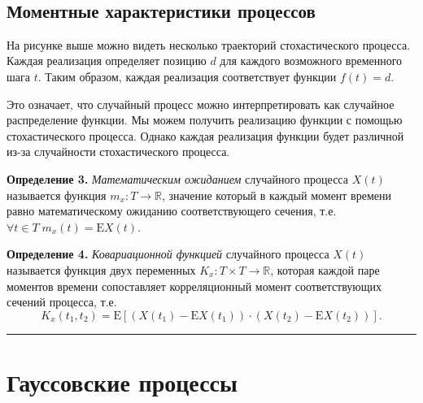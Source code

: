 \documentclass[11pt,a4paper]{article}
\renewcommand{\linethickness}{0.1ex}
\begin{document}
    \begin{center}
    \end{center}
    { \hspace*{\fill} \\}
    
    \hypertarget{ux43cux43eux43cux435ux43dux442ux43dux44bux435-ux445ux430ux440ux430ux43aux442ux435ux440ux438ux441ux442ux438ux43aux438-ux43fux440ux43eux446ux435ux441ux441ux43eux432}{%
\subsection{Моментные характеристики
процессов}\label{ux43cux43eux43cux435ux43dux442ux43dux44bux435-ux445ux430ux440ux430ux43aux442ux435ux440ux438ux441ux442ux438ux43aux438-ux43fux440ux43eux446ux435ux441ux441ux43eux432}}

На рисунке выше можно видеть несколько траекторий стохастического
процесса. Каждая реализация определяет позицию \(d\) для каждого
возможного временного шага \(t\). Таким образом, каждая реализация
соответствует функции \(f(t) = d\).

Это означает, что случайный процесс можно интерпретировать как случайное
распределение функции. Мы можем получить реализацию функции с помощью
стохастического процесса. Однако каждая реализация функции будет
различной из-за случайности стохастического процесса.

\textbf{Определение 3.} \emph{Математическим ожиданием} случайного
процесса \(X(t)\) называется функция \(m_x : T \rightarrow \mathbb{R}\),
значение который в каждый момент времени равно математическому ожиданию
соответствующего сечения, т.е.
\(\forall t \in T \; m_x(t) = \mathrm{E}X(t)\).

\textbf{Определение 4.} \emph{Ковариационной функцией} случайного
процесса \(X(t)\) называется функция двух переменных
\(K_x : T \times T \rightarrow \mathbb{R}\), которая каждой паре
моментов времени сопоставляет корреляционный момент соответствующих
сечений процесса, т.е. \[
    K_x(t_1, t_2) = \mathrm{E} \left[ \left(X(t_1) - \mathrm{E}X(t_1)\right) \cdot \left(X(t_2) - \mathrm{E}X(t_2)\right) \right].
\]

    \begin{center}\rule{0.5\linewidth}{\linethickness}\end{center}

    \hypertarget{ux433ux430ux443ux441ux441ux43eux432ux441ux43aux438ux435-ux43fux440ux43eux446ux435ux441ux441ux44b}{%
\section{Гауссовские
процессы}\label{ux433ux430ux443ux441ux441ux43eux432ux441ux43aux438ux435-ux43fux440ux43eux446ux435ux441ux441ux44b}}
\end{document}
